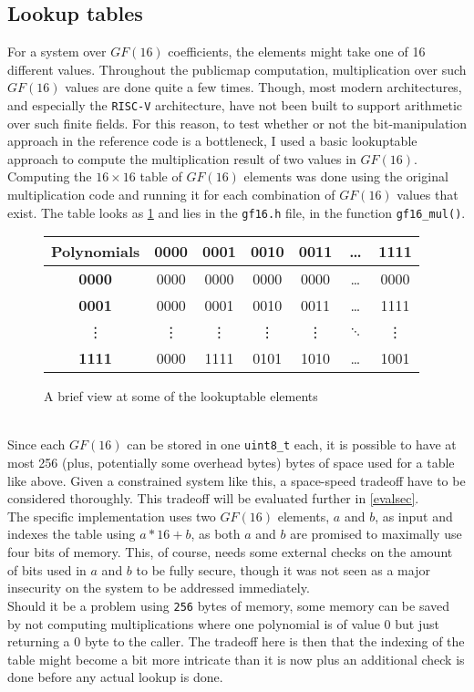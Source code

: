 \subsection{Lookup tables} \label{opt:lookup}
For a system over $GF(16)$ coefficients, the elements might take one of 16 different values. Throughout the publicmap computation, multiplication over such $GF(16)$ values are done quite a few times. Though, most modern architectures, and especially the \texttt{RISC-V} architecture, have not been built to support arithmetic over such finite fields. For this reason, to test whether or not the bit-manipulation approach in the reference code is a bottleneck, I used a basic lookuptable approach to compute the multiplication result of two values in $GF(16)$.\medskip\\
Computing the $16 \times 16$ table of $GF(16)$ elements was done using the original multiplication code and running it for each combination of $GF(16)$ values that exist. 
The table looks as \cref{lookuptable} and lies in the \texttt{gf16.h} file, in the function \texttt{gf16\_mul()}.
\begin{figure}[h]
    \centering
    \begin{tabular}{|c|c|c|c|c|c|c|}
        \hline
            \textbf{Polynomials} & \textbf{0000} & \textbf{0001} & \textbf{0010} & \textbf{0011} & \dots & \textbf{1111} \\
        \hline
            \textbf{0000} & 0000 & 0000 & 0000 & 0000 & \dots & 0000\\
        \hline
            \textbf{0001} & 0000 & 0001 & 0010 & 0011 & \dots & 1111\\
        \hline
            \vdots & \vdots & \vdots & \vdots & \vdots & $\ddots$ & \vdots\\
        \hline
            \textbf{1111} & 0000 & 1111 & 0101 & 1010 & \dots & 1001\\
        \hline
    \end{tabular}
    \caption{A brief view at some of the lookuptable elements}
    \label{lookuptable}
\end{figure}\\
Since each $GF(16)$ can be stored in one \texttt{uint8\_t} each, it is possible to have at most 256 (plus, potentially some overhead bytes) bytes of space used for a table like above. Given a constrained system like this, a space-speed tradeoff have to be considered thoroughly. This tradeoff will be evaluated further in \cref{evalsec}.\medskip\\
The specific implementation uses two $GF(16)$ elements, $a$ and $b$, as input and indexes the table using $a*16 + b$, as both $a$ and $b$ are promised to maximally use four bits of memory. This, of course, needs some external checks on the amount of bits used in $a$ and $b$ to be fully secure, though it was not seen as a major insecurity on the system to be addressed immediately.\medskip\\
Should it be a problem using \texttt{256} bytes of memory, some memory can be saved by not computing multiplications where one polynomial is of value $0$ but just returning a $0$ byte to the caller. The tradeoff here is then that the indexing of the table might become a bit more intricate than it is now plus an additional check is done before any actual lookup is done.
